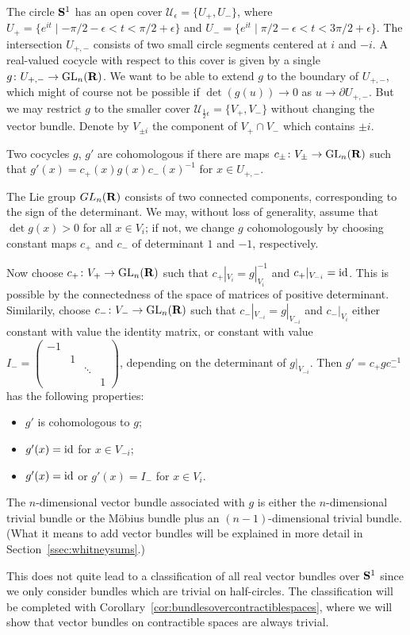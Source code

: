 \documentclass[a4paper,openany]{scrbook}
\begin{document}
\begin{example} \label{exa:bundlesons1}
The circle $\S^1$ has an open cover $\mathcal U_\epsilon = \{U_+,U_-\}$, where $U_+ = \{e^{it} \mid -\pi/2-\epsilon < t < \pi/2+\epsilon\}$ and $U_- = \{e^{it} \mid \pi/2-\epsilon < t < 3\pi/2+\epsilon\}$. The intersection $U_{+,-}$ consists of two small circle segments centered at $i$ and $-i$.  A real-valued cocycle with respect to this cover is given by a single $g\colon U_{+,-} \to \GL_n(\R)$. We want to be able to extend $g$ to the boundary of $U_{+,-}$, which might of course not be possible if $\det(g(u)) \to 0$ as $u \to \partial U_{+,-}$. But we may restrict $g$ to the smaller cover $\mathcal U_{\frac12\epsilon} = \{V_+,V_-\}$ without changing the vector bundle. 
Denote by $V_{\pm i}$ the component of $V_+ \cap V_-$ which contains $\pm i$.

Two cocycles $g$, $g'$ are cohomologous if there are maps $c_\pm\colon V_\pm \to \GL_n(\R)$ such that $g'(x)=c_+(x)g(x)c_-(x)^{-1}$ for $x \in U_{+,-}$.

The Lie group $GL_n(\R)$ consists of two connected components, corresponding to the sign of the determinant. We may, without loss of generality, assume that $\det g(x)>0$ for all $x \in V_i$; if not, we change $g$ cohomologously by choosing constant maps $c_+$ and $c_-$ of determinant $1$ and $-1$, respectively.

Now choose $c_+\colon V_+ \to \GL_n(\R)$ such that $c_+|_{V_i} = g|_{V_i}^{-1}$ and $c_+|_{V_{-i}} =  \id$. This is possible by the connectedness of the space of matrices of positive determinant. Similarily, choose $c_-\colon V_- \to \GL_n(\R)$ such that $c_-|_{V_{-i}} = g|_{V_{-i}}$ and $c_-|_{V_{i}}$ either constant with value the identity matrix, or constant with value $I_- = \begin{pmatrix}-1\\&1\\&& \ddots\\&&&1\end{pmatrix}$, depending on the determinant of $g|_{V_{-i}}$. Then $g' = c_+gc_-^{-1}$ has the following properties:
\begin{itemize}
\item $g'$ is cohomologous to $g$;
\item $g'(x) = \id$ for $x \in V_{-i}$;
\item $g'(x) = \id$ or $g'(x) = I_-$ for $x \in V_{i}$.
\end{itemize}
The $n$-dimensional vector bundle associated with $g$ is either the $n$-dimensional trivial bundle or the Möbius bundle plus an $(n-1)$-dimensional trivial bundle. (What it means to add vector bundles will be explained in more detail in Section~\ref{ssec:whitneysums}.)

This does not quite lead to a classification of all real vector bundles over $\S^1$ since we only consider bundles which are trivial on half-circles. The classification will be completed with Corollary~\ref{cor:bundlesovercontractiblespaces}, where we will  show that vector bundles on contractible spaces are always trivial. 
\end{example}
\end{document}
